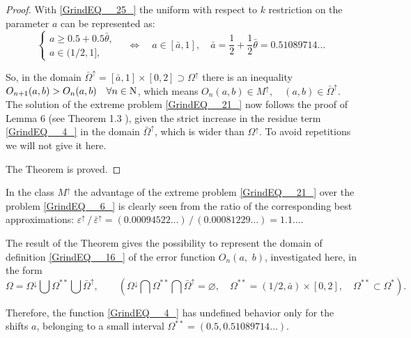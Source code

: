 \documentclass[
11pt,%
tightenlines,%
twoside,%
onecolumn,%
nofloats,%
nobibnotes,%
nofootinbib,%
superscriptaddress,%
noshowpacs,%
centertags]%
{revtex4}
\begin{document}
\begin{proof}
With \eqref{GrindEQ__25_} the uniform with respect to $k$ restriction on the parameter $a$ can be represented as:
$$
\left\{\begin{array}{l} {a  \ge  0.5   +  0.5  \bar{\theta } ,} \\ {a \in   (1/2,   1] ,} \end{array}\right. \quad\Leftrightarrow \quad a \in   [ \bar{a}  ,   1] , \quad        \bar{a}  =  \frac{1}{2}   +  \frac{1}{2} \bar{\theta } =  0.51089714\dots
$$

So, in the domain $\bar{\Omega }^{\uparrow } =  [ \bar{a} ,    1]\times [0,   2] \supset  \Omega ^{\uparrow }  $ there is an inequality $O_{n +1} (a,  b)   >  O_{n} (a,  b)   \quad   \forall  n\in {\rm N}  $, which means $O_{n} ( a,   b)\in M^{\uparrow } , \quad     ( a,   b)\in   \bar{\Omega }^{\uparrow } $. The solution of the extreme problem \eqref{GrindEQ__21_} now follows the proof of Lemma 6 (see Theorem 1.3 \cite{Sh19}), given the strict increase in the residue term \eqref{GrindEQ__4_} in the domain  $\bar{\Omega }^{\uparrow } $, which is wider than $\Omega ^{\uparrow } $. To avoid repetitions we will not give it here.

The Theorem is proved.
\end{proof}

\begin{remark} In the class $M^{\uparrow } $ the advantage of the extreme problem \eqref{GrindEQ__21_} over the problem \eqref{GrindEQ__6_} is clearly seen from the ratio of the corresponding best approximations:	 $ \varepsilon ^{\uparrow } \, /\, \bar{\varepsilon }^{\uparrow } =( 0.00094522\dots)\, /\, (0.00081229\dots)= 1.1\dots $.
\end{remark}

\begin{remark} The result of the Theorem gives the possibility to represent the domain of definition \eqref{GrindEQ__16_} of the error function $O_{n} (a,\, \, b)$, investigated here, in the form
$$
\Omega   =  \Omega ^{\downarrow }  \bigcup   \Omega ^{**}  \bigcup   \bar{\Omega }^{\uparrow }, \qquad \left(  \Omega ^{\downarrow }  \bigcap   \Omega ^{**}  \bigcap   \bar{\Omega }^{\uparrow }  =  \varnothing,   \quad      \Omega ^{**}  =(1/2,     \bar{a})\times [0,   2],  \quad     \Omega ^{**}  \subset  \Omega ^{*}  \right).
$$
\end{remark} Therefore, the function \eqref{GrindEQ__4_} has undefined behavior only for the shifts $a$, belonging to a small interval  $\Omega ^{**} =(0.5, 0.51089714\dots) $.
\end{document}
